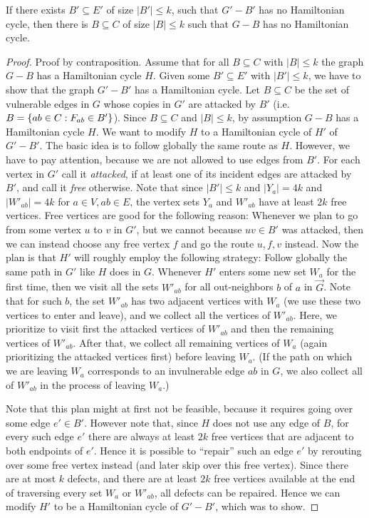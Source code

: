 \begin{lemma}
\label{lem:hamcycle-if}
    If there exists $B' \subseteq E'$ of size $|B'| \leq k$, such that $G' - B'$ has no Hamiltonian cycle, then there is $B \subseteq C$ of size $|B| \leq k$ such that $G - B$ has no Hamiltonian cycle.
\end{lemma}
\begin{proof}
    Proof by contraposition. Assume that for all $B \subseteq C$ with $|B| \leq k$ the graph $G - B$ has a Hamiltonian cycle $H$.
    Given some $B' \subseteq E'$ with $|B'| \leq k$, we have to show that the graph $G' - B'$ has a Hamiltonian cycle. Let $B \subseteq C$ be the set of vulnerable edges in $G$ whose copies in $G'$ are attacked by $B'$ (i.e. $B = \{ ab \in C : F_{ab} \in B' \}$). 
    Since $B \subseteq C$ and $|B| \leq k$, by assumption $G - B$ has a Hamiltonian cycle $H$. We want to modify $H$ to a Hamiltonian cycle of $H'$ of $G' - B'$. 
    The basic idea is to follow globally the same route as $H$. However, we have to pay attention, because we are not allowed to use edges from $B'$.
    For each vertex in $G'$ call it \emph{attacked}, if at least one of its incident edges are attacked by $B'$, and call it \emph{free} otherwise. 
    Note that since $|B'| \leq k$ and $|Y_a| = 4k$ and $|W'_{ab}| = 4k$ for $a \in V, ab \in E$, the vertex sets $Y_a$ and $W'_{ab}$ have at least $2k$ free vertices. Free vertices are good for the following reason: 
    Whenever we plan to go from some vertex $u$ to $v$ in $G'$, but we cannot because $uv \in B'$ was attacked, then we can instead choose any free vertex $f$ and go the route $u,f,v$ instead.
    Now the plan is that $H'$ will roughly employ the following strategy: Follow globally the same path in $G'$ like $H$ does in $G$. 
    Whenever $H'$ enters some new set $W_a$ for the first time, then we visit all the sets $W'_{ab}$ for all out-neighbors $b$ of $a$ in $\overrightarrow{G}$.
    Note that for such $b$, the set $W'_{ab}$ has two adjacent vertices with $W_a$ (we use these two vertices to enter and leave), and we collect all the vertices of $W'_{ab}$. 
    Here, we prioritize to visit first the attacked vertices of $W'_{ab}$ and then the remaining vertices of $W'_{ab}$. 
    After that, we collect all remaining vertices of $W_a$ (again prioritizing the attacked vertices first) before leaving $W_a$. (If the path on which we are leaving $W_a$ corresponds to an invulnerable edge $ab$ in $G$, we also collect all of $W'_{ab}$ in the process of leaving $W_a$.)

    Note that this plan might at first not be feasible, because it requires going over some edge $e' \in B'$. However note that, since $H$ does not use any edge of $B$, for every such edge $e'$ there are always at least $2k$ free vertices that are adjacent to both endpoints of $e'$.
    Hence it is possible to \enquote{repair} such an edge $e'$ by rerouting over some free vertex instead (and later skip over this free vertex). 
    Since there are at most $k$ defects, and there are at least $2k$ free vertices available at the end of traversing every set $W_a$ or $W'_{ab}$, all defects can be repaired. 
    Hence we can modify $H'$ to be a Hamiltonian cycle of $G' - B'$, which was to show.
\end{proof}

